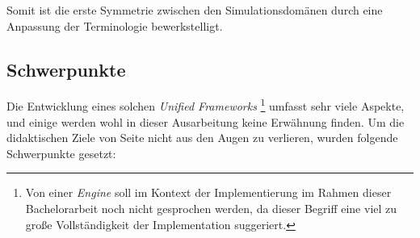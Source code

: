 Somit ist die erste Symmetrie zwischen den Simulationsdomänen durch eine Anpassung der Terminologie bewerkstelligt.





\subsection{Schwerpunkte}

Die Entwicklung eines solchen \emph{Unified Frameworks}
\footnote{Von einer \emph{Engine} soll im Kontext der Implementierung im Rahmen dieser Bachelorarbeit noch nicht 
gesprochen werden, da dieser Begriff eine viel zu große Vollständigkeit der Implementation suggeriert.} umfasst sehr viele Aspekte, und einige werden wohl in dieser Ausarbeitung keine Erwähnung finden. Um die didaktischen Ziele von Seite \pageref{list:didacticGoals} nicht aus den Augen zu verlieren, wurden folgende Schwerpunkte gesetzt:

